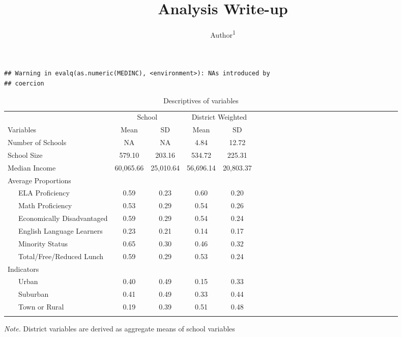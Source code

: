 \documentclass[man]{apa6}
\title{Analysis Write-up}
\author{Author\textsuperscript{1}}
\affiliation{
    \vspace{0.5cm}
          \textsuperscript{1} School/Bakery  }
\theoremstyle{definition}
\theoremstyle{definition}
\theoremstyle{definition}
\theoremstyle{remark}
\begin{document}
\maketitle

\setcounter{secnumdepth}{0}



\begin{verbatim}
## Warning in evalq(as.numeric(MEDINC), <environment>): NAs introduced by
## coercion
\end{verbatim}

\begin{table}[tbp]
\begin{center}
\begin{threeparttable}
\caption{\label{tab:tbl-desc}Descriptives of variables}
\begin{tabular}{lcccclcccclcccclcccclcccc}
\toprule
 & \multicolumn{2}{c}{School} & \multicolumn{2}{c}{District Weighted} \\
\cmidrule(r){2-3} \cmidrule(r){4-5}
Variables & Mean & SD & Mean & SD\\
\midrule
Number of Schools & NA & NA & 4.84 & 12.72\\
School Size & 579.10 & 203.16 & 534.72 & 225.31\\
Median Income & 60,065.66 & 25,010.64 & 56,696.14 & 20,803.37\\
Average Proportions &  &  &  & \\
\ \ \ ELA Proficiency & 0.59 & 0.23 & 0.60 & 0.20\\
\ \ \ Math Proficiency & 0.53 & 0.29 & 0.54 & 0.26\\
\ \ \ Economically Disadvantaged & 0.59 & 0.29 & 0.54 & 0.24\\
\ \ \ English Language Learners & 0.23 & 0.21 & 0.14 & 0.17\\
\ \ \ Minority Status & 0.65 & 0.30 & 0.46 & 0.32\\
\ \ \ Total/Free/Reduced Lunch & 0.59 & 0.29 & 0.53 & 0.24\\
Indicators &  &  &  & \\
\ \ \ Urban & 0.40 & 0.49 & 0.15 & 0.33\\
\ \ \ Suburban & 0.41 & 0.49 & 0.33 & 0.44\\
\ \ \ Town or Rural & 0.19 & 0.39 & 0.51 & 0.48\\
\bottomrule
\addlinespace
\end{tabular}
\begin{tablenotes}[para]
\textit{Note.} District variables are derived as aggregate means of school variables
\end{tablenotes}
\end{threeparttable}
\end{center}
\end{table}
\end{document}
